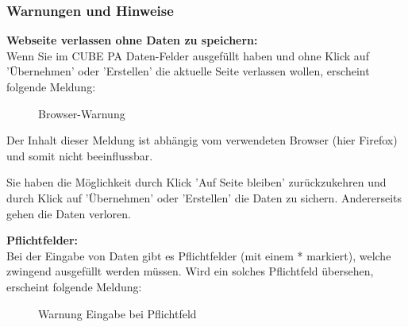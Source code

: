 \pagebreak
\subsubsection{Warnungen und Hinweise}

\textbf{Webseite verlassen ohne Daten zu speichern:} \\
Wenn Sie im CUBE PA Daten-Felder ausgefüllt haben und ohne Klick auf 'Übernehmen' oder 'Erstellen' die aktuelle Seite verlassen wollen, erscheint folgende Meldung: 

\begin{figure}[H]
\caption{Browser-Warnung}
\end{figure}
\begin{small}
Der Inhalt dieser Meldung ist abhängig vom verwendeten Browser (hier Firefox) und somit nicht beeinflussbar.
\end{small}

\vspace{\baselineskip}

Sie haben die Möglichkeit durch Klick 'Auf Seite bleiben' zurückzukehren und durch Klick auf 'Übernehmen' oder 'Erstellen' die Daten zu sichern. Andererseits gehen die Daten verloren.

\vspace{\baselineskip}

\textbf{Pflichtfelder:}\\
Bei der Eingabe von Daten gibt es Pflichtfelder (mit einem * markiert), welche zwingend ausgefüllt werden müssen. Wird ein solches Pflichtfeld übersehen, erscheint folgende Meldung:

\begin{figure}[H]
\caption{Warnung Eingabe bei Pflichtfeld}
\end{figure}

